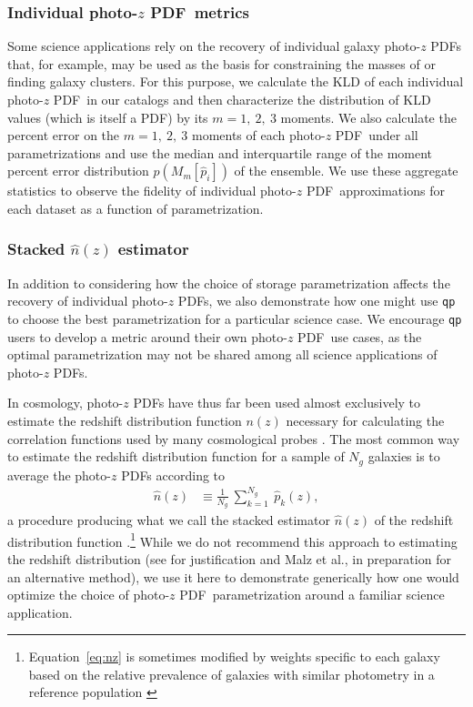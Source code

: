 \documentclass[\docopts]{\docclass}
\newcommand{\pz}{photo-$z$ PDF}
\begin{document}
\subsubsection{Individual \pz\ metrics}
\label{sec:individual_metric}

Some science applications rely on the recovery of individual galaxy \pz s that, 
for example, may be used as the basis for constraining the masses of 
\citep{applegate_weighing_2014} or finding \citep{radovich_searching_2017} 
galaxy clusters.
For this purpose, we calculate the KLD of each individual \pz\ in our catalogs 
and then characterize the distribution of KLD values (which is itself a PDF) by 
its $m=1,\ 2,\ 3$ moments.
We also calculate the percent error on the $m=1,\ 2,\ 3$ moments of each \pz\ 
under all parametrizations and use the median and interquartile range of the 
moment percent error distribution $p(M_{m}[\hat{p}_{i}])$ of the ensemble.
We use these aggregate statistics to observe the fidelity of individual \pz\ 
approximations for each dataset as a function of parametrization.

\subsubsection{Stacked $\hat{n}(z)$ estimator}
\label{sec:stacked_metric}

In addition to considering how the choice of storage parametrization affects 
the recovery of individual \pz s, we also demonstrate how one might use 
\texttt{qp} to choose the best parametrization for a particular science case.
We encourage \texttt{qp} users to develop a metric around their own \pz\ use 
cases, as the optimal parametrization may not be shared among all science 
applications of \pz s.

In cosmology, \pz s have thus far been used almost exclusively to estimate the 
redshift distribution function $n(z)$ necessary for calculating the correlation 
functions used by many cosmological probes \citep{clampitt_galaxygalaxy_2017, 
hildebrandt_kids-450:_2017}.
The most common way to estimate the redshift distribution function for a sample 
of $N_{g}$ galaxies is to average the \pz s according to
\begin{align}
  \label{eq:nz}
  \hat{n}(z) &\equiv \frac{1}{N_{g}}\ \sum_{k=1}^{N_{g}}\ \hat{p}_{k}(z),
\end{align}
a procedure producing what we call the stacked estimator $\hat{n}(z)$ of the 
redshift distribution function \citep{harnois-deraps_kids-450:_2017, 
hoyle_dark_2017}.\footnote{
Equation~\ref{eq:nz} is sometimes modified by weights specific to each galaxy 
based on the relative prevalence of galaxies with similar photometry in a 
reference population \citep{sheldon_photometric_2012, 
troster_cross-correlation_2017}
}
While we do not recommend this approach to estimating the redshift distribution 
(see \citet{choi_cfhtlens_2016} for justification and Malz et al., in 
preparation for an alternative method), we use it here to demonstrate 
generically how one would optimize the choice of \pz\ parametrization around a 
familiar science application.
\end{document}
